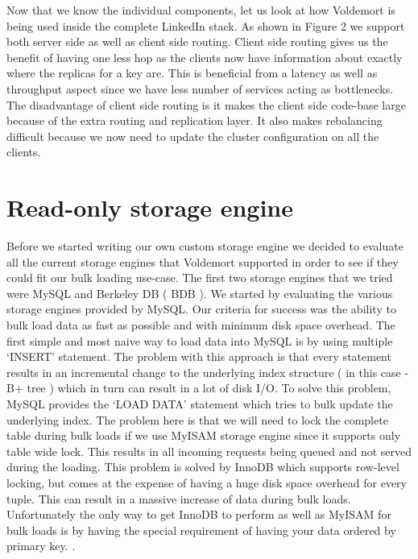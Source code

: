 \documentclass[10pt,twocolumn,preprint,natbib,authoryear]{sigplanconf}
\begin{document}
Now that we know the individual components, let us look at how Voldemort is being used inside the complete LinkedIn stack. As shown in Figure 2 we support both server side as well as client side routing. Client side routing gives us the benefit of having one less hop as the clients now have information about exactly where the replicas for a key are. This is beneficial from a latency as well as throughput aspect since we have less number of services acting as bottlenecks. The disadvantage of client side routing is it makes the client side code-base large because of the extra routing and replication layer. It also makes rebalancing difficult because we now need to update the cluster configuration on all the clients. 

\section{Read-only storage engine}

Before we started writing our own custom storage engine we decided to evaluate all the current storage engines that Voldemort supported in order to see if they could fit our bulk loading use-case. The first two storage engines that we tried were MySQL and Berkeley DB ( BDB ). We started by evaluating the various storage engines provided by MySQL. Our criteria for success was the ability to bulk load data as fast as possible and with minimum disk space overhead. The first simple and most naive way to load data into MySQL is by using multiple `INSERT' statement. The problem with this approach is that every statement results in an incremental change to the underlying index structure ( in this case - B+ tree ) which in turn can result in a lot of disk I/O. To solve this problem, MySQL provides the `LOAD DATA' statement which tries to bulk update the underlying index. The problem here is that we will need to lock the complete table during bulk loads if we use MyISAM storage engine since it supports only table wide lock. This results in all incoming requests being queued and not served during the loading. This problem is solved by InnoDB which supports row-level locking, but comes at the expense of having a huge disk space overhead for every tuple. This can result in a massive increase of data during bulk loads. Unfortunately the only way to get InnoDB to perform as well as MyISAM for bulk loads is by having the special requirement of having your data ordered by primary key.  \cite{http://blogs.oracle.com/carriergrademysql/entry/tips_for_bulk_loading}. 
\end{document}
